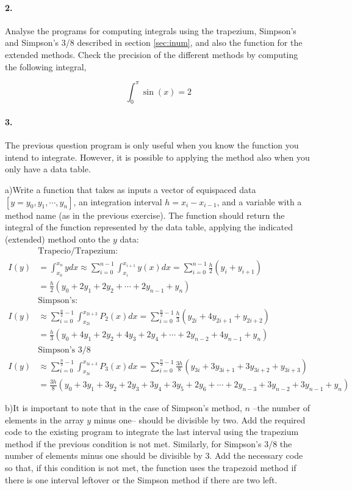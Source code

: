 \paragraph{2.} Analyse the programs for computing integrals using the trapezium, Simpson's and Simpson's 3/8 described in section \ref{sec:inum}, and also the function for the extended methods. Check the precision of the different methods by computing the following integral,  

\begin{equation*}
\int_0^{\pi} \sin(x) = 2
\end{equation*}
	

\paragraph{3.} The previous question program is only useful when you know the function you intend to integrate. However, it is possible to applying the method also when you only have a data table.

a)Write a function that takes as inputs a vector of equispaced data $[y= y_0,y_1,\cdots,y_n]$, an integration interval $h=x_i - x_{i-1}$,  and a variable with a method name (as in the previous exercise). The function should return the integral of the function represented by the data table, applying the  indicated (extended) method onto the $y$ data:
\begin{align*}
 &\text{Trapecio/Trapezium:}\\
I(y)&=\int_{x_0}^{x_n}ydx \approx \sum_{i=0}^{n-1}\int_{x_i}^{x_{i+1}}y(x)dx=\sum_{i=0}^{n-1}\frac{h}{2}(y_i+y_{i+1})\\
&=\frac{h}{2}\left(y_0+2y_1+2y_2+\cdots+2y_{n-1}+y_n \right)\\
 &\text{Simpson's:} \\
I(y)&\approx \sum_{i=0}^{\frac{n}{2}-1}\int_{x_{2i}}^{x_{2i+2}}P_2(x)dx=\sum_{i=0}^{\frac{n}{2}-1}\frac{h}{3}(y_{2i}+4y_{2i+1}+y_{2i+2})\\
&= \frac{h}{3}(y_0+4y_1+2y_2+4y_3+2y_4+\cdots + 2y_{n-2}+4y_{n-1}+y_n)\\
&\text{Simpson's 3/8}\\
I(y)&\approx \sum_{i=0}^{\frac{n}{3}-1}\int_{x_{3i}}^{x_{3i+3}}P_3(x)dx=\sum_{i=0}^{\frac{n}{3}-1}\frac{3h}{8}(y_{3i}+3y_{3i+1}+3y_{3i+2}+y_{3i+3})\\
&= \frac{3h}{8}(y_0+3y_1+3y_2+2y_3+3y_4+3y_5+2y_6+ \cdots + 2y_{n-3}+3y_{n-2}+3y_{n-1}+y_n)
\end{align*}


b)It is important to note that in the case of Simpson's method, $n$ --the number of elements in the array $y$ minus one-- should be divisible by two. Add the required code to the existing program to integrate the last interval using the trapezium method if the previous condition is not met. Similarly, for Simpson's 3/8 the number of elements minus one should be divisible by 3. Add the necessary code so that, if this condition is not met, the function uses the trapezoid method if there is one interval leftover or the Simpson method if there are two left.    


